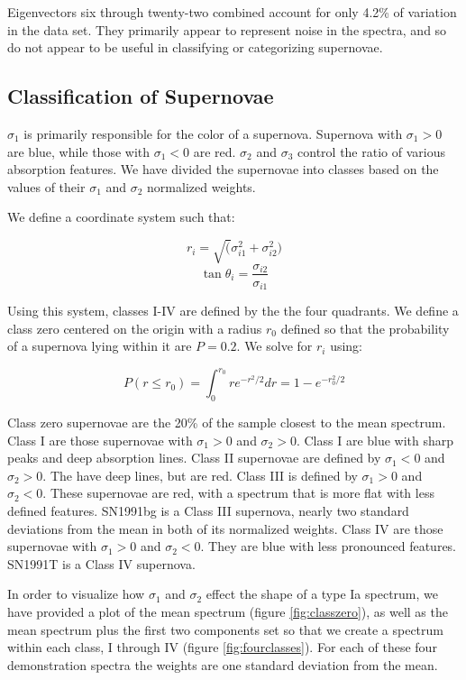 Eigenvectors six through twenty-two combined account for only 4.2\% of variation in the data set. They primarily appear to represent noise in the spectra, and so do not appear to be useful in classifying or categorizing supernovae.

\subsection{Classification of Supernovae}
$\sigma_{1}$ is primarily responsible for the color of a supernova. Supernova with $\sigma_{1} > 0$ are blue, while those with $\sigma_{1} < 0$ are red. $\sigma_{2}$ and $\sigma_{3}$ control the ratio of various absorption features. We have divided the supernovae into classes based on the values of their $\sigma_{1}$ and $\sigma_{2}$ normalized weights. 

We define a coordinate system such that:

$$ r_{i} = \sqrt( \sigma^{2}_{i1} + \sigma^{2}_{i2} )$$
$$ \tan{\theta_{i}} = \frac {\sigma_{i2}}{\sigma_{i1}} $$

Using this system, classes I-IV are defined by the the four quadrants. We define a class zero centered on the origin with a radius $r_{0}$ defined so that the probability of a supernova lying within it are $P = 0.2$. We solve for $r_{i}$ using:

$$ P(r \le r_{0}) = \int_{0}^{r_{0}} r e^{-r^{2}/2} dr = 1 -  e^{-r_{0}^{2}/2} $$

Class zero supernovae are the 20\% of the sample closest to the mean spectrum. Class I are those supernovae with $\sigma_{1} > 0$ and $\sigma_{2} > 0$. Class I are blue with sharp peaks and deep absorption lines. Class II supernovae are defined by $\sigma_{1} < 0$ and $\sigma_{2} > 0$. The have deep lines, but are red. Class III is defined by $\sigma_{1} > 0$ and $\sigma_{2} < 0$. These supernovae are red, with a spectrum that is more flat with less defined features. SN1991bg is a Class III supernova, nearly two standard deviations from the mean in both of its normalized weights. Class IV are those supernovae with $\sigma_{1} > 0$ and $\sigma_{2} < 0$. They are blue with less pronounced features. SN1991T is a Class IV supernova.

In order to visualize how $\sigma_{1}$ and $\sigma_{2}$ effect the shape of a type Ia spectrum, we have provided a plot of the mean spectrum (figure \ref{fig:classzero}), as well as the mean spectrum plus the first two components set so that we create a spectrum within each class, I through IV (figure \ref{fig:fourclasses}). For each of these four demonstration spectra the weights are one standard deviation from the mean.

